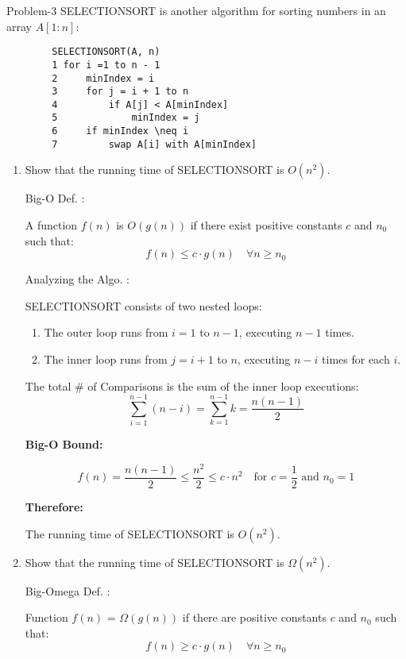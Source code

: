 \begin{problem}{}{Problem-3}
	SELECTIONSORT is another algorithm for sorting numbers in an array \( A[1 : n] \):
	\begin{verbatim}
		SELECTIONSORT(A, n)
		1 for i =1 to n - 1
		2     minIndex = i
		3     for j = i + 1 to n
		4         if A[j] < A[minIndex]
		5             minIndex = j
		6     if minIndex \neq i
		7         swap A[i] with A[minIndex]
	\end{verbatim}
	
	\begin{enumerate}[label=(\alph*)]
		\item Show that the running time of SELECTIONSORT is \( O(n^2) \).
		
		Big-O Def. :
		
		A function \( f(n) \) is \( O(g(n)) \) if there exist positive constants \( c \) and \( n_0 \) such that:
		\[
		f(n) \leq c \cdot g(n) \quad \forall n \geq n_0
		\]
		
		Analyzing the Algo. :
		
		SELECTIONSORT consists of two nested loops:
		
		\begin{enumerate}
			\item The outer loop runs from \( i = 1 \) to \( n-1 \), executing \( n-1 \) times.
			\item The inner loop runs from \( j = i+1 \) to \( n \), executing \( n - i \) times for each \( i \).
		\end{enumerate}
		
		 The total \# of Comparisons is the sum of the inner loop executions:
		\[
		\sum_{i=1}^{n-1} (n - i) = \sum_{k=1}^{n-1} k = \frac{n(n-1)}{2}
		\]
		
		\textbf{Big-O Bound:}
		
		\[
		f(n) = \frac{n(n-1)}{2} \leq \frac{n^2}{2} \leq c \cdot n^2 \quad \text{for } c = \frac{1}{2} \text{ and } n_0 = 1
		\]
		
		\textbf{Therefore:}
		
		The running time of SELECTIONSORT is \( O(n^2) \). 
		
		\item Show that the running time of SELECTIONSORT is \( \Omega(n^2) \).
		
		Big-Omega Def. :
		
		Function \( f(n) \) = \( \Omega(g(n)) \) if there are positive constants \( c \) and \( n_0 \) such that:
		\[
		f(n) \geq c \cdot g(n) \quad \forall n \geq n_0
		\]
		

\end{enumerate}
\end{problem}
